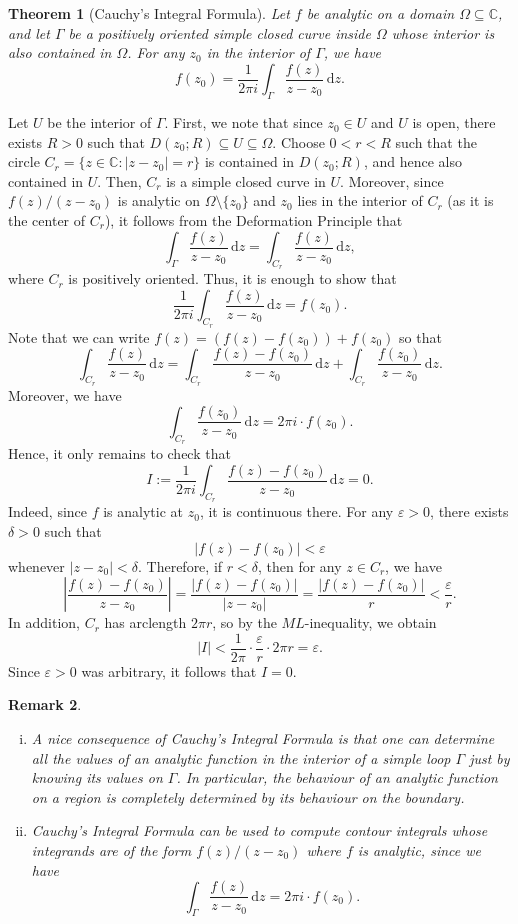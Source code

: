 \documentclass[10pt]{article}
\makeatletter
\newcommand{\eps}{\varepsilon}
\newcommand{\C}{\mathbb{C}}
\newcommand{\dd}{\,\mathrm{d}}
\theoremstyle{newstyle}
\newtheorem{thm}{Theorem}[section]
\newtheorem{remark}[thm]{Remark}
\newenvironment{pf}[1][\proofname]{\par
  \pushQED{\qed}%
  \normalfont \topsep0\p@\relax
  \trivlist
  \item[\hskip\labelsep\scshape
  #1\@addpunct{.}]\ignorespaces
}{%
  \popQED\endtrivlist\@endpefalse
}
\makeatother
\begin{document}
\begin{thm}[Cauchy's Integral Formula]
Let $f$ be analytic on a domain $\Omega \subseteq \C$, and let $\Gamma$ be a 
positively oriented simple closed curve inside $\Omega$ whose interior is also 
contained in $\Omega$. For any $z_0$ in the interior of $\Gamma$, we have 
\[ f(z_0) = \frac{1}{2\pi i} \int_\Gamma \frac{f(z)}{z-z_0}\dd z. \]
\end{thm}
\begin{pf}
Let $U$ be the interior of $\Gamma$. First, we note that since $z_0 \in U$ and 
$U$ is open, there exists $R > 0$ such that $D(z_0; R) \subseteq U \subseteq \Omega$. 
Choose $0 < r < R$ such that the circle $C_r = \{z \in \C : |z - z_0| = r\}$ 
is contained in $D(z_0; R)$, and hence also contained in $U$. Then, $C_r$ is a 
simple closed curve in $U$. Moreover, since $f(z)/(z-z_0)$ is analytic on 
$\Omega \setminus \{z_0\}$ and $z_0$ lies in the interior of $C_r$ 
(as it is the center of $C_r$), it follows from the Deformation Principle that 
\[ \int_\Gamma \frac{f(z)}{z-z_0}\dd z = \int_{C_r} \frac{f(z)}{z - z_0}\dd z, \]
where $C_r$ is positively oriented. Thus, it is enough to show that 
\[ \frac{1}{2\pi i} \int_{C_r} \frac{f(z)}{z-z_0}\dd z = f(z_0). \]
Note that we can write $f(z) = (f(z) - f(z_0)) + f(z_0)$ so that 
\[ \int_{C_r} \frac{f(z)}{z - z_0} \dd z = \int_{C_r} \frac{f(z) - f(z_0)}{z - z_0}\dd z 
+ \int_{C_r} \frac{f(z_0)}{z - z_0}\dd z. \]
Moreover, we have 
\[ \int_{C_r} \frac{f(z_0)}{z - z_0} \dd z = 2\pi i \cdot f(z_0). \]
Hence, it only remains to check that 
\[ I := \frac{1}{2\pi i} \int_{C_r} \frac{f(z) - f(z_0)}{z - z_0} \dd z = 0. \]
Indeed, since $f$ is analytic at $z_0$, it is continuous there. For any $\eps > 0$, 
there exists $\delta > 0$ such that 
\[ |f(z) - f(z_0)| < \eps \]
whenever $|z - z_0| < \delta$. Therefore, if $r < \delta$, then for any $z \in C_r$, 
we have 
\[ \left| \frac{f(z) - f(z_0)}{z - z_0} \right| = \frac{|f(z) - f(z_0)|}{|z-z_0|} 
= \frac{|f(z) - f(z_0)|}r < \frac{\eps}r. \]
In addition, $C_r$ has arclength $2\pi r$, so by the $ML$-inequality, we obtain 
\[ |I| < \frac{1}{2\pi} \cdot \frac{\eps}r \cdot 2\pi r = \eps. \]
Since $\eps > 0$ was arbitrary, it follows that $I = 0$. 
\end{pf}

\begin{remark}~
\begin{enumerate}[(i)]
    \item A nice consequence of Cauchy's Integral Formula is that one can determine all the 
    values of an analytic function in the interior of a simple loop $\Gamma$ 
    just by knowing its values on $\Gamma$. In particular, the behaviour of an 
    analytic function on a region is completely determined by its behaviour on the boundary. 
    \item Cauchy's Integral Formula can be used to compute contour integrals whose integrands 
    are of the form $f(z)/(z-z_0)$ where $f$ is analytic, since we have 
    \[ \int_\Gamma \frac{f(z)}{z-z_0} \dd z = 2\pi i \cdot f(z_0). \]
\end{enumerate}
\end{remark}
\end{document}
